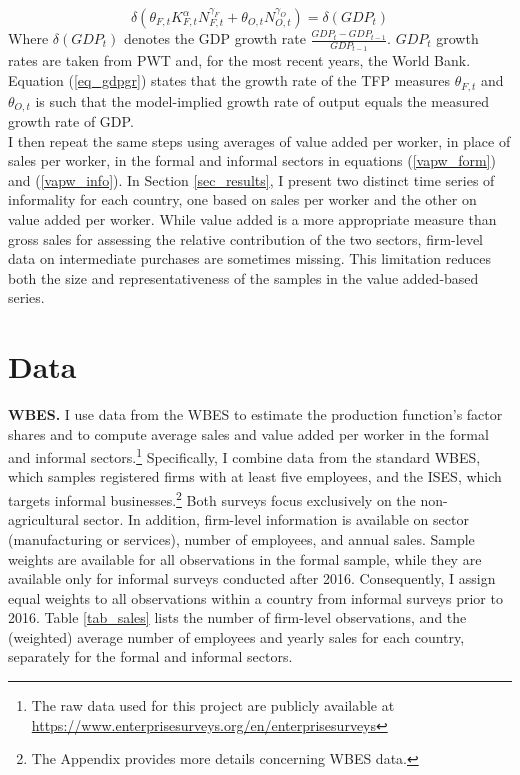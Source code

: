\documentclass[letterpaper, 12pt]{article}
\begin{document}
\begin{equation}
    \delta(\theta_{F,t} K_{F,t}^{\alpha}N_{F,t}^{\gamma_F}+\theta_{O,t} N_{O,t}^{\gamma_O}) = \delta(GDP_t)\label{eq_gdpgr}
\end{equation}
Where $\delta(GDP_t)$ denotes the GDP growth rate $\frac{GDP_t-GDP_{t-1}}{GDP_{t-1}}$. $GDP_t$ growth rates are taken from PWT and, for the most recent years, the World Bank. Equation (\ref{eq_gdpgr}) states that the growth rate of the TFP measures $\theta_{F,t}$ and $\theta_{O,t}$ is such that the model-implied growth rate of output equals the measured growth rate of GDP.
\\I then repeat the same steps using averages of value added per worker, in place of sales per worker, in the formal and informal sectors in equations (\ref{vapw_form}) and (\ref{vapw_info}). In Section \ref{sec_results}, I present two distinct time series of informality for each country, one based on sales per worker and the other on value added per worker. While value added is a more appropriate measure than gross sales for assessing the relative contribution of the two sectors, firm-level data on intermediate purchases are sometimes missing. This limitation reduces both the size and representativeness of the samples in the value added-based series.

\section{Data}\label{sec_data}
\textbf{WBES.} I use data from the WBES to estimate the production function's factor shares and to compute average sales and value added per worker in the formal and informal sectors.\footnote{The raw data used for this project are publicly available at \\ \href{https://www.enterprisesurveys.org/en/enterprisesurveys}{https://www.enterprisesurveys.org/en/enterprisesurveys}} Specifically, I combine data from the standard WBES, which samples registered firms with at least five employees, and the ISES, which targets informal businesses.\footnote{The Appendix provides more details concerning WBES data.} Both surveys focus exclusively on the non-agricultural sector. In addition, firm-level information is available on sector (manufacturing or services), number of employees, and annual sales. Sample weights are available for all observations in the formal sample, while they are available only for informal surveys conducted after 2016. Consequently, I assign equal weights to all observations within a country from informal surveys prior to 2016. Table \ref{tab_sales} lists the number of firm-level observations, and the (weighted) average number of employees and yearly sales for each country, separately for the formal and informal sectors.
\end{document}
